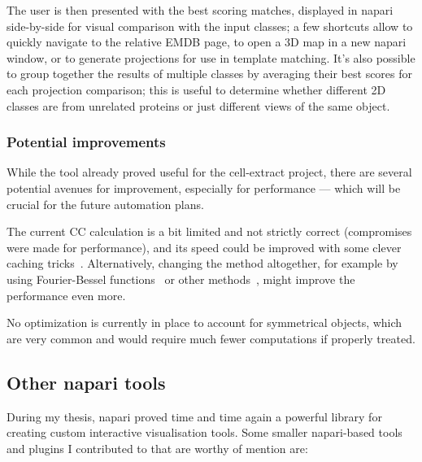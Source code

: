 The user is then presented with the best scoring matches, displayed in napari side-by-side for visual comparison with the input classes; a few shortcuts allow to quickly navigate to the relative EMDB page, to open a 3D map in a new napari window, or to generate projections for use in template matching.
It's also possible to group together the results of multiple classes by averaging their best scores for each projection comparison; this is useful to determine whether different 2D classes are from unrelated proteins or just different views of the same object.

\subsubsection{Potential improvements}

While the tool already proved useful for the cell-extract project, there are several potential avenues for improvement, especially for performance --- which will be crucial for the future automation plans.

The current CC calculation is a bit limited and not strictly correct (compromises were made for performance), and its speed could be improved with some clever caching tricks~\cite{kasoComputationNormalizedCrosscorrelation2018}.
Alternatively, changing the method altogether, for example by using Fourier-Bessel functions~\cite{zhaoFourierBesselRotational2013} or other methods~\cite{almiraFastNormalizedCrosscorrelation2024}, might improve the performance even more.

No optimization is currently in place to account for symmetrical objects, which are very common and would require much fewer computations if properly treated.

\subsection{Other napari tools}

During my thesis, napari proved time and time again a powerful library for creating custom interactive visualisation tools.
Some smaller napari-based tools and plugins I contributed to that are worthy of mention are:

